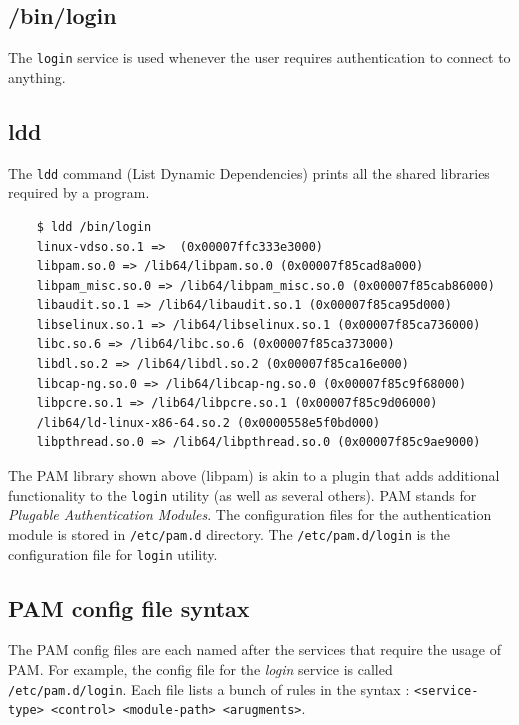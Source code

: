 \documentclass{report}
\begin{document}
	\subsection{/bin/login}
	The \verb|login| service is used whenever the user requires authentication to connect to anything. 
	
	\subsection{ldd}
	The \verb|ldd| command (List Dynamic Dependencies) prints all the shared libraries required by a program. 
	
	\begin{verbatim}
	$ ldd /bin/login
	linux-vdso.so.1 =>  (0x00007ffc333e3000)
	libpam.so.0 => /lib64/libpam.so.0 (0x00007f85cad8a000)
	libpam_misc.so.0 => /lib64/libpam_misc.so.0 (0x00007f85cab86000)
	libaudit.so.1 => /lib64/libaudit.so.1 (0x00007f85ca95d000)
	libselinux.so.1 => /lib64/libselinux.so.1 (0x00007f85ca736000)
	libc.so.6 => /lib64/libc.so.6 (0x00007f85ca373000)
	libdl.so.2 => /lib64/libdl.so.2 (0x00007f85ca16e000)
	libcap-ng.so.0 => /lib64/libcap-ng.so.0 (0x00007f85c9f68000)
	libpcre.so.1 => /lib64/libpcre.so.1 (0x00007f85c9d06000)
	/lib64/ld-linux-x86-64.so.2 (0x0000558e5f0bd000)
	libpthread.so.0 => /lib64/libpthread.so.0 (0x00007f85c9ae9000)
	\end{verbatim}
	
	\noindent
	The PAM library shown above (libpam) is akin to a plugin that adds additional functionality to the \verb|login| utility (as well as several others). PAM stands for \textit{Plugable Authentication Modules}. The configuration files for the authentication module is stored in \verb|/etc/pam.d| directory. The \verb|/etc/pam.d/login| is the configuration file for \verb|login| utility. 
	
	\subsection{PAM config file syntax}
	The PAM config files are each named after the services that require the usage of PAM. For example, the config file for the \textit{login} service is called \verb|/etc/pam.d/login|. Each file lists a bunch of rules in the syntax : \verb|<service-type> <control> <module-path> <arugments>|.
	
\end{document}
